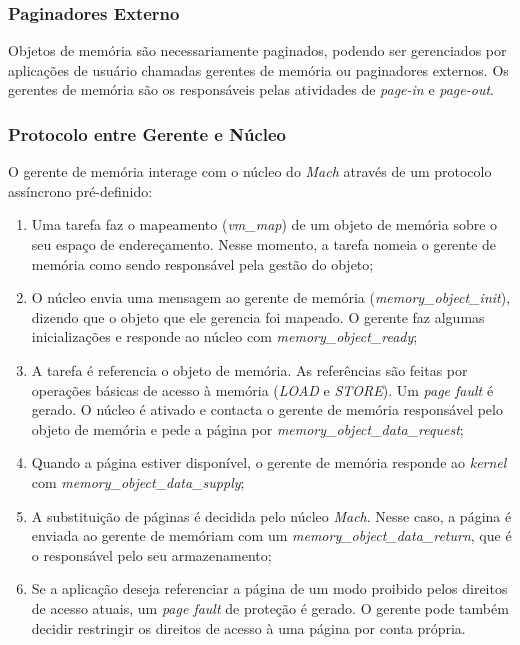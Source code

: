\subsubsection{Paginadores Externo}
Objetos de memória são necessariamente paginados, podendo ser gerenciados por aplicações de usuário chamadas gerentes de memória ou paginadores externos. Os gerentes de memória são os responsáveis pelas atividades de \textit{page-in} e \textit{page-out}.


\subsubsection{Protocolo entre Gerente e Núcleo}
O gerente de memória interage com o núcleo do \textit{Mach} através de um protocolo assíncrono pré-definido:

\begin{enumerate}
  \item Uma tarefa faz o mapeamento (\textit{vm\_map}) de um objeto de memória sobre o seu espaço de endereçamento. Nesse momento, a tarefa nomeia o gerente de memória como sendo responsável pela gestão do objeto;

  \item O núcleo envia uma mensagem ao gerente de memória (\textit{memory\_object\_init}), dizendo que o objeto que ele gerencia foi mapeado. O gerente faz algumas inicializações e responde ao núcleo com \textit{memory\_object\_ready};

  \item A tarefa é referencia o objeto de memória. As referências são feitas por operações básicas de acesso à memória (\textit{LOAD} e \textit{STORE}). Um \textit{page fault} é gerado. O núcleo é ativado e contacta o gerente de memória responsável pelo objeto de memória e pede a página por \textit{memory\_object\_data\_request};

  \item Quando a página estiver disponível, o gerente de memória responde ao \textit{kernel} com \textit{memory\_object\_data\_supply};

  \item A substituição de páginas é decidida pelo núcleo \textit{Mach}. Nesse caso, a página é enviada ao gerente de memóriam com um \textit{memory\_object\_data\_return}, que é o responsável pelo seu armazenamento;

  \item Se a aplicação deseja referenciar a página de um modo proibido pelos direitos de acesso atuais, um \textit{page fault} de proteção é gerado. O gerente pode também decidir restringir os direitos de acesso à uma página por conta própria.
\end{enumerate}

